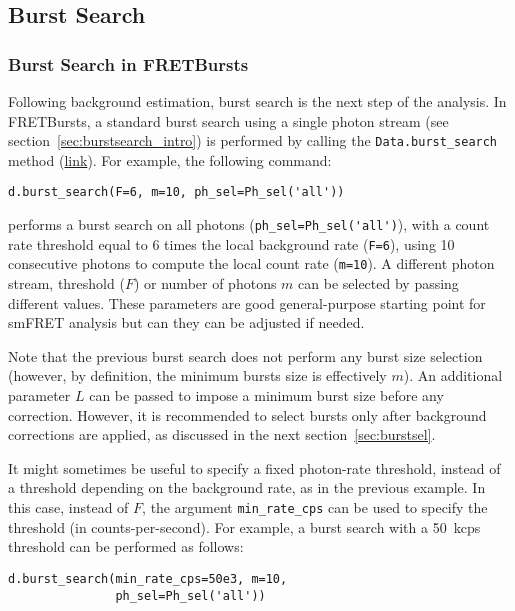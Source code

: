 \subsection{Burst Search}
\label{sec:burstsearch}

\subsubsection{Burst Search in FRETBursts}
\label{sec:burstsearch_code}

Following background estimation, burst search is the next step of
the analysis.
In FRETBursts, a standard burst search using a single photon stream
(see section~\ref{sec:burstsearch_intro}) is performed by calling the
\verb|Data.burst_search| method
(\href{http://fretbursts.readthedocs.org/en/latest/data_class.html#fretbursts.burstlib.Data.burst_search}{link}).
For example, the following command:

\begin{lstlisting}
d.burst_search(F=6, m=10, ph_sel=Ph_sel('all'))
\end{lstlisting}

performs a burst search on all photons
(\verb|ph_sel=Ph_sel('all')|), with a count rate threshold equal to 6 times the
local background rate (\verb|F=6|), using 10 consecutive photons to compute the
local count rate (\verb|m=10|).
A different photon stream, threshold ($F$) or number of photons $m$ can be selected 
by passing different values. 
These parameters are good general-purpose starting point for smFRET analysis 
but can they can be adjusted if needed.

Note that the previous burst search does not perform any burst size selection 
(however, by definition, the minimum bursts size is effectively $m$).
An additional parameter $L$ can be passed to impose a minimum burst
size before any correction.
However, it is recommended to select bursts only after background corrections
are applied, as discussed in the next section~\ref{sec:burstsel}.

It might sometimes be useful to specify a fixed photon-rate threshold, instead
of a threshold depending on the background rate, as in the previous example. In
this case, instead of $F$, the argument \verb|min_rate_cps| can be used to
specify the threshold (in counts-per-second). For example, a burst search with a 50~kcps
threshold can be performed as follows:

\begin{lstlisting}
d.burst_search(min_rate_cps=50e3, m=10, 
               ph_sel=Ph_sel('all'))
\end{lstlisting}

